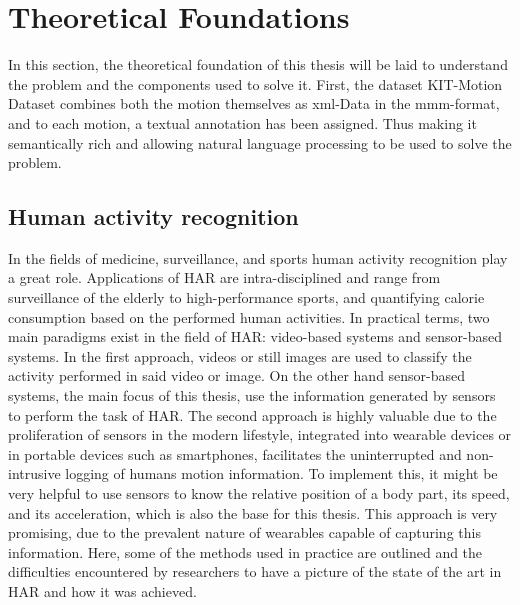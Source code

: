 \chapter{Theoretical Foundations}
In this section, the theoretical foundation of this thesis will be laid to understand the problem and the components used to solve it. First, the dataset KIT-Motion Dataset combines both the motion themselves as xml-Data in the mmm-format, and to each motion, a textual annotation has been assigned. Thus making it semantically rich and allowing natural language processing to be used to solve the problem.
\section{Human activity recognition}\label{sec:HAR}
In the fields of medicine, surveillance, and sports human activity recognition play a great role. Applications of HAR are intra-disciplined and range from surveillance of the elderly to high-performance sports, and quantifying calorie consumption based on the performed human activities. In practical terms, two main paradigms exist in the field of HAR: video-based systems and sensor-based systems\cite{chen2021deep}. In the first approach, videos or still images are used to classify the activity performed in said video or image. On the other hand sensor-based systems, the main focus of this thesis, use the information generated by sensors to perform the task of HAR. The second approach is highly valuable due to the proliferation of sensors in the modern lifestyle, integrated into wearable devices or in portable devices such as smartphones, facilitates the uninterrupted and non-intrusive logging of humans motion information\cite{chen2021deep}.\newline
To implement this, it might be very helpful to use sensors to know the relative position of a body part, its speed, and its acceleration, which is also the base for this thesis. This approach is very promising, due to the prevalent nature of wearables capable of capturing this information. Here, some of the methods used in practice are outlined and the difficulties encountered by researchers to have a picture of the state of the art in HAR and how it was achieved.\newline
